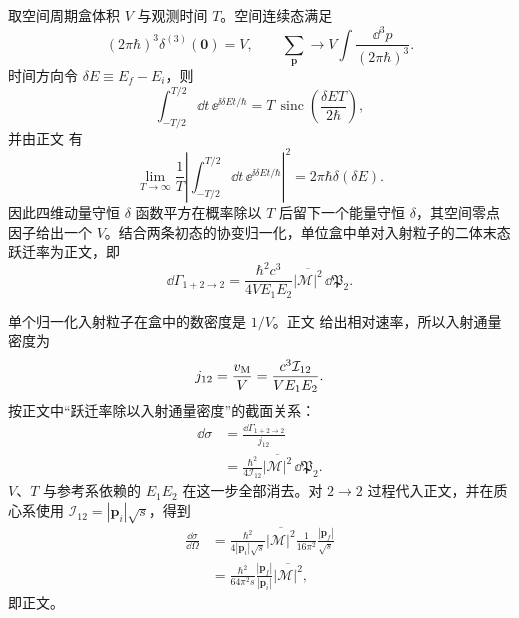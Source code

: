\begin{derivation}[盒归一化怎样给出二体散射截面]

取空间周期盒体积 $V$ 与观测时间 $T$。空间连续态满足
\begin{equation*}
 (2\pi\hbar)^3\delta^{(3)}(\mathbf0)=V,
 \qquad
 \sum_{\mathbf p}\longrightarrow
 V\int\frac{\dd^3 p}{(2\pi\hbar)^3}.
\end{equation*}
时间方向令 $\delta E\equiv E_f-E_i$，则
\begin{equation*}
 \int_{-T/2}^{T/2}\dd t\,\ee^{\ii\delta E t/\hbar}
 =T\,\operatorname{sinc}\!\left(\frac{\delta E T}{2\hbar}\right),
\end{equation*}
并由正文 有
\begin{equation*}
 \lim_{T\to\infty}\frac1T
 \left|\int_{-T/2}^{T/2}\dd t\,\ee^{\ii\delta E t/\hbar}\right|^2
 =2\pi\hbar\delta(\delta E).
\end{equation*}
因此四维动量守恒 $\delta$ 函数平方在概率除以 $T$ 后留下一个能量守恒 $\delta$，其空间零点因子给出一个 $V$。结合两条初态的协变归一化，单位盒中单对入射粒子的二体末态跃迁率为正文，即
\begin{equation*}
 \dd\Gamma_{1+2\to2}
 =\frac{\hbar^2c^3}{4VE_1E_2}
 \overline{|\mathcal M|^2}\,\dd\mathfrak P_2.
\end{equation*}

单个归一化入射粒子在盒中的数密度是 $1/V$。正文 给出相对速率，所以入射通量密度为
\begin{equation*}
 j_{12}=\frac{v_{\rm M}}{V}
 =\frac{c^3\mathcal I_{12}}{VE_1E_2}.
\end{equation*}
按正文中“跃迁率除以入射通量密度”的截面关系：
\begin{align*}
 \dd\sigma
 &=\frac{\dd\Gamma_{1+2\to2}}{j_{12}}\\
 &=\frac{\hbar^2}{4\mathcal I_{12}}
 \overline{|\mathcal M|^2}\,\dd\mathfrak P_2.
\end{align*}
$V$、$T$ 与参考系依赖的 $E_1E_2$ 在这一步全部消去。对 $2\to2$ 过程代入正文，并在质心系使用
$\mathcal I_{12}=|\mathbf p_i|\sqrt s$，得到
\begin{align*}
 \frac{\dd\sigma}{\dd\Omega}
 &=\frac{\hbar^2}{4|\mathbf p_i|\sqrt s}
 \overline{|\mathcal M|^2}
 \frac1{16\pi^2}\frac{|\mathbf p_f|}{\sqrt s}\\
 &=\frac{\hbar^2}{64\pi^2s}
 \frac{|\mathbf p_f|}{|\mathbf p_i|}
 \overline{|\mathcal M|^2},
\end{align*}
即正文。
\end{derivation}

